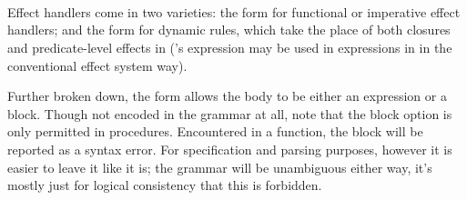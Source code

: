 \begin{bnf*}
     \\
     \\
     \\
     \\
     \\
     \\
     \\
     \\
\end{bnf*}

Effect handlers come in two varieties: the  form for functional
or imperative effect handlers; and the  form for dynamic rules,
which take the place of both closures and predicate-level effects in \Law{}
(\Poetry{}'s  expression may be used in expressions in \Law{}
in the conventional effect system way).

Further broken down, the  form allows the body to be either an expression
or a block. Though not encoded in the grammar at all, note that the block
option is only permitted in procedures. Encountered in a function, the block
will be reported as a syntax error. For specification and parsing purposes, however
it is easier to leave it like it is; the grammar will be unambiguous either way,
it's mostly just for logical consistency that this is forbidden.

